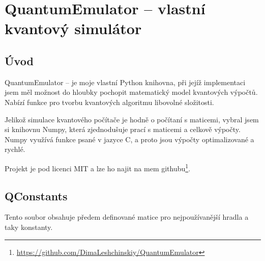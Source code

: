 \documentclass[11pt]{article}
\begin{document}
\newpage

\section{QuantumEmulator – vlastní kvantový simulátor}
\label{sec:QuantumEmulator}
\subsection{Úvod}
QuantumEmulator – je moje vlastní Python knihovna, při jejíž implementaci jsem měl možnost do hloubky pochopit matematický model kvantových výpočtů.
Nabízí funkce pro tvorbu kvantových algoritmu libovolné složitosti.
\par Jelikož simulace kvantového počítače je hodně o počítaní s maticemi, vybral jsem si knihovnu Numpy, která zjednodušuje prací s maticemi a celkově výpočty.
Numpy využívá funkce psané v jazyce C, a proto jsou výpočty optimalizované a rychlé.
\par Projekt je pod licenci MIT a lze ho najit na mem githubu\footnote{\url{https://github.com/DimaLeshchinskiy/QuantumEmulator}}.

\subsection{QConstants}
Tento soubor obsahuje předem definované matice pro nejpoužívanější hradla a taky konstanty.
\end{document}
